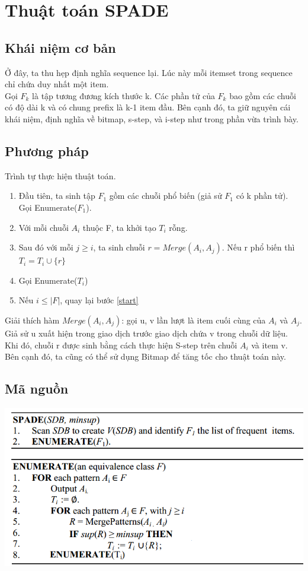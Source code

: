 \documentclass[a4paper 14pt]{article}
\begin{document}
	\section{Thuật toán SPADE}
		\subsection{Khái niệm cơ bản}
			Ở đây, ta thu hẹp định nghĩa sequence lại. Lúc này mỗi itemset trong sequence chỉ chứa duy nhất một item.\\
			Gọi $F_k$ là tập tương đương kích thước k. Các phần tử của $F_k$ bao gồm các chuỗi có độ dài k và có chung prefix là k-1 item đầu. Bên cạnh đó, ta giữ nguyên cái khái niệm, định nghĩa về bitmap, s-step, và i-step như trong phần vừa trình bày.
		\subsection{Phương pháp}
			Trình tự thực hiện thuật toán.
			\begin{enumerate}
				\item Đầu tiên, ta sinh tập $F_1$ gồm các chuỗi phổ biến (giả sử $F_1$ có k phần tử). Gọi Enumerate($F_1$).
				\item\label{start} Với mỗi chuỗi $A_i$ thuộc F, ta khởi tạo $T_i$ rỗng. 
				\item Sau đó với mỗi $j \geq i$, ta sinh chuỗi $r = Merge(A_i, A_j)$. Nếu r phổ biến thì $T_i = T_i \cup \{r\}$
				\item Gọi Enumerate($T_i$)
				\item Nếu $i \leq |F|$, quay lại bước \ref{start}
			\end{enumerate}  
			Giải thích hàm $Merge(A_i, A_j)$: gọi u, v lần lượt là item cuối cùng của $A_i$ và $A_j$. Giả sử u xuất hiện trong giao dịch trước giao dịch chứa v trong chuỗi dữ liệu. Khi đó, chuỗi r được sinh bằng cách thực hiện S-step trên chuỗi $A_i$ và item v.\\
			Bên cạnh đó, ta cũng có thể sử dụng Bitmap để tăng tốc cho thuật toán này.
		\subsection{Mã nguồn}
			\includegraphics[scale = 0.5]{spade} 
\end{document}
